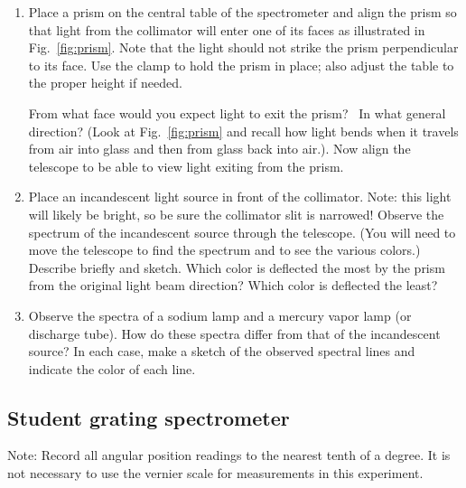 \begin{enumerate}
\item Place a prism on the central table of the spectrometer and align
the prism so that light from the collimator will enter one of its faces
as illustrated in Fig.~\ref{fig:prism}.  Note that the light should not strike the
prism perpendicular to its face. Use the clamp to hold the prism in
place; also adjust the table to the proper height if needed. 


From what face would you expect light to exit the prism? \ In what
general direction? (Look at Fig.~\ref{fig:prism} and recall how light bends when it
travels from air into glass and then from glass back into air.). Now
align the telescope to be able to view light exiting from the prism.

\item Place an incandescent light source in front of the collimator.
Note: this light will likely be bright, so be sure the collimator slit
is narrowed! Observe the spectrum of the incandescent source through
the telescope.   (You will need to move the telescope to find the
spectrum and to see the various colors.)  Describe briefly and sketch.
 Which color is deflected the most by the prism from the original
light beam direction?  Which color is deflected the least? 

\item Observe the spectra of a sodium lamp and a mercury vapor lamp (or
discharge tube). How do these spectra differ from that of the
incandescent source? In each case, make a sketch of the observed
spectral lines and indicate the color of each line.
\end{enumerate}

\subsection{Student grating spectrometer}
Note:  Record all angular position readings to the nearest tenth of a
degree.  It is not necessary to use the vernier scale for measurements
in this experiment.

